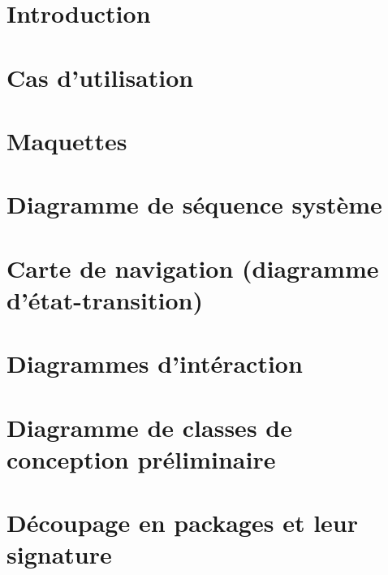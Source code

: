 \documentclass[asi]{picInsa}
\title{\DCP{}}
\author{\Florian{}, \Kafui{}, \Melissa{}, \Julie{}, \Mathieu{}} %
\begin{document}
\couverture{}

 \informationsGenerales{}


\tableofcontents

\setcounter{chapter}{0}


\chapter*{Introduction}
\label{intro}


\chapter{Cas d'utilisation}
\label{casUtilisation}


\chapter{Maquettes}
\label{maquettes}


\chapter{Diagramme de séquence système}
\label{diagrammeSequenceSysteme}


\chapter{Carte de navigation (diagramme d'état-transition)}
\label{diagrammeNavigation}


\chapter{Diagrammes d'intéraction}
\label{diagrammeInteraction}


\chapter{Diagramme de classes de conception préliminaire}
\label{diagrammeClasses}


\chapter{Découpage en packages et leur signature}
\label{diagrammePackages}

\end{document}
